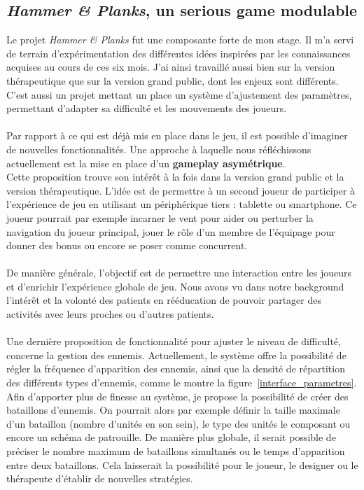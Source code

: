 	\subsection{\emph{Hammer \& Planks}, un serious game modulable}
Le projet \emph{Hammer \& Planks} fut une composante forte de mon stage. Il m'a servi de terrain d'expérimentation des différentes idées inspirées par les connaissances acquises au cours de ces six mois. J'ai ainsi travaillé aussi bien sur la version thérapeutique que sur la version grand public, dont les enjeux sont différents. C'est aussi un projet mettant un place un système d'ajustement des paramètres, permettant d'adapter sa difficulté et les mouvements des joueurs.

	\paragraph{}Par rapport à ce qui est déjà mis en place dans le jeu, il est possible d'imaginer de nouvelles fonctionnalités. Une approche à laquelle nous réfléchissons actuellement est la mise en place d'un \textbf{gameplay asymétrique}. \\
Cette proposition trouve son intérêt à la fois dans la version grand public et la version thérapeutique. L'idée est de permettre à un second joueur de participer à l'expérience de jeu en utilisant un périphérique tiers : tablette ou smartphone. Ce joueur pourrait par exemple incarner le vent pour aider ou perturber la navigation du joueur principal, jouer le rôle d'un membre de l'équipage pour donner des bonus ou encore se poser comme concurrent. 

\paragraph{}De manière générale, l'objectif est de permettre une interaction entre les joueurs et d'enrichir l'expérience globale de jeu. Nous avons vu dans notre background l'intérêt et la volonté des patients en rééducation de pouvoir partager des activités avec leurs proches ou d'autres patients.

\paragraph{} Une dernière proposition de fonctionnalité pour ajuster le niveau de difficulté, concerne la gestion des ennemis. Actuellement, le système offre la possibilité de régler la fréquence d'apparition des ennemis, ainsi que la densité de répartition des différents types d'ennemis, comme le montre la figure~\ref{interface_parametres}. \\
Afin d'apporter plus de finesse au système, je propose la possibilité de créer des bataillons d'ennemis. On pourrait alors par exemple définir la taille maximale d'un bataillon (nombre d'unités en son sein), le type des unités le composant ou encore un schéma de patrouille. De manière plus globale, il serait possible de préciser le nombre maximum de bataillons simultanés ou le temps d'apparition entre deux bataillons. Cela laisserait la possibilité pour le joueur, le designer ou le thérapeute d'établir de nouvelles stratégies. 

